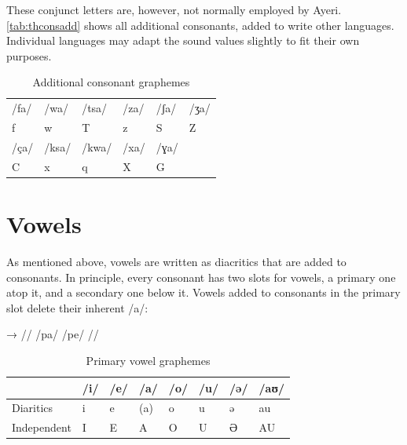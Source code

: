 These conjunct letters are, however, not normally employed by Ayeri.
\autoref{tab:thconsadd} shows all additional consonants, added to write other
languages. Individual languages may adapt the sound values slightly to fit
their own purposes.

\begin{table}[t]
\caption{Additional consonant graphemes}

\begin{tabu} to \linewidth{X[c] X[c] X[c] X[c] X[c] X[c]}
\toprule
\tableheaderfont	/fa/ & /wa/ & /tsa/ & /za/ & /ʃa/ & /ʒa/ \\
\rowfont{\Tagati\huge}	f & w & T & z & S & Z \\

\midrule

\tableheaderfont	/ça/ & /ksa/ & /kwa/ & /xa/ & /ɣa/ \\
\rowfont{\Tagati\huge}	C & x & q & X & G \\

\bottomrule
\end{tabu}
\label{tab:thconsadd}
\end{table}


\section{Vowels}

As mentioned above, vowels are written as diacritics that are added to 
consonants. In principle, every consonant has two slots for vowels, a primary 
one atop it, and a secondary one below it. Vowels added to consonants in 
the primary slot delete their inherent /a/:

\ex[lingstyle=thex]\begingl
	\gla {}	→	 //
	\glb /pa/	{}	/pe/ //
\endgl\xe

\begin{table}[t]
\caption{Primary vowel graphemes}

\begin{tabu} to \linewidth{H[c] X[c] X[c] X[c] X[c] X[c] X[c] X[c]}
\toprule
\tableheaderfont

	& /i/
	& /e/
	& /a/
	& /o/
	& /u/
	& /ə/
	& /aʊ/
	\\
	
\toprule
	
Diaritics
	& \Tagati\huge *i
	& \Tagati\huge *e
	& \huge ({\Tagati *a})
	& \Tagati\huge *o
	& \Tagati\huge *u
	& \Tagati\huge *ə
	& \Tagati\huge *au
	\\

\midrule

Independent
	& \Tagati\huge I
	& \Tagati\huge E
	& \Tagati\huge A
	& \Tagati\huge O
	& \Tagati\huge U
	& \Tagati\huge Ə
	& \Tagati\huge AU
	\\

\bottomrule
\end{tabu}
\label{tab:thvowstop}
\end{table}

